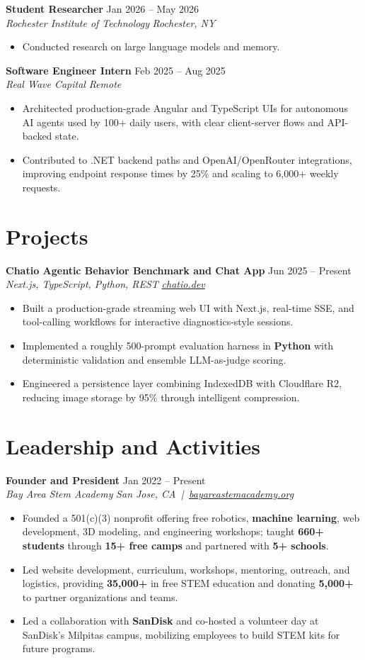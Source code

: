 \documentclass[10pt,letterpaper]{article}
\newif\ifresumeFirstRole
\newcommand{\resumeRole}[4]{%
  \ifresumeFirstRole
    \global\resumeFirstRolefalse
  \else
    \vspace{0pt plus 1fill}%
  \fi
  \textbf{#1} \hfill #2\\
  \textit{#3} \hfill \textit{#4}
}
\begin{document}
\resumeRole{Student Researcher}{Jan 2026 -- May 2026}{Rochester Institute of Technology}{Rochester, NY}
\begin{itemize}
  \item Conducted research on large language models and memory.
\end{itemize}

\resumeRole{Software Engineer Intern}{Feb 2025 -- Aug 2025}{Real Wave Capital}{Remote}
\begin{itemize}
  \item Architected production-grade Angular and TypeScript UIs for autonomous AI agents used by 100+ daily users, with clear client-server flows and API-backed state.
  \item Contributed to .NET backend paths and OpenAI/OpenRouter integrations, improving endpoint response times by 25\% and scaling to 6,000+ weekly requests.
\end{itemize}

\section*{Projects}
\resumeRole{Chatio Agentic Behavior Benchmark and Chat App}{Jun 2025 -- Present}{Next.js, TypeScript, Python, REST}{\href{https://chatio.dev}{chatio.dev}}
\begin{itemize}
  \item Built a production-grade streaming web UI with Next.js, real-time SSE, and tool-calling workflows for interactive diagnostics-style sessions.
  \item Implemented a roughly 500-prompt evaluation harness in \textbf{Python} with deterministic validation and ensemble LLM-as-judge scoring.
  \item Engineered a persistence layer combining IndexedDB with Cloudflare R2, reducing image storage by 95\% through intelligent compression.
\end{itemize}

\section*{Leadership and Activities}
\resumeRole{Founder and President}{Jan 2022 -- Present}{Bay Area Stem Academy}{San Jose, CA \,|\, \href{https://bayareastemacademy.org}{bayareastemacademy.org}}
\begin{itemize}
  \item Founded a 501(c)(3) nonprofit offering free robotics, \textbf{machine learning}, web development, 3D modeling, and engineering workshops; taught \textbf{660+ students} through \textbf{15+ free camps} and partnered with \textbf{5+ schools}.
  \item Led website development, curriculum, workshops, mentoring, outreach, and logistics, providing \textbf{\textdollar{}35,000+} in free STEM education and donating \textbf{\textdollar{}5,000+} to partner organizations and teams.
  \item Led a collaboration with \textbf{SanDisk} and co-hosted a volunteer day at SanDisk's Milpitas campus, mobilizing employees to build STEM kits for future programs.
\end{itemize}
\end{document}
